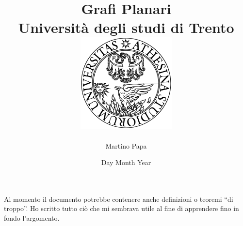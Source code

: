 \documentclass[12pt]{report}
\title{
{Grafi Planari}\\
{\large Università degli studi di Trento} \bigskip \\
{\includegraphics[width=50mm]{logo_bn.png}}
}
\author{Martino Papa}
\date{Day Month Year}
\theoremstyle{definition}
\theoremstyle{plain}
\begin{document}
\maketitle
\tableofcontents

Al momento il documento potrebbe contenere anche definizioni o teoremi “di troppo”. Ho scritto tutto ciò che mi sembrava utile al fine di apprendere fino in fondo l'argomento.








% 



\end{document}
